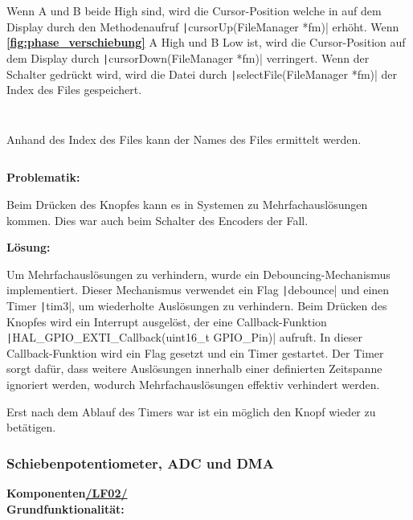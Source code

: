Wenn A und B beide High sind, wird die Cursor-Position welche in auf dem Display durch den Methodenaufruf \texttt|cursorUp(FileManager *fm)|
erhöht. Wenn  \textbf{\autoref{fig:phase_verschiebung}} A High und B Low ist, wird die Cursor-Position auf dem Display durch \texttt|cursorDown(FileManager *fm)| verringert. Wenn der Schalter gedrückt wird, wird die Datei durch \texttt|selectFile(FileManager *fm)| der Index des Files gespeichert. 

\newpage 
 \inputminted[firstline=68, lastline=74]{c}{../../f401_display_encoder_fader_test/Core/Src/filemanager.c}
 
  \inputminted[firstline=84, lastline=90]{c}{../../f401_display_encoder_fader_test/Core/Src/filemanager.c}
  
Anhand des Index des Files kann der Names des Files ermittelt werden.

	
\inputminted[firstline=159, lastline=161]{c}{../../f401_display_encoder_fader_test/Core/Src/filemanager.c}

\textbf{Problematik:}

Beim Drücken des Knopfes kann es in Systemen zu Mehrfachauslösungen kommen. Dies war auch beim Schalter des Encoders der Fall.

\textbf{Lösung:}

Um Mehrfachauslösungen zu verhindern, wurde ein Debouncing-Mechanismus implementiert. Dieser Mechanismus verwendet ein Flag \texttt|debounce| und einen Timer \texttt|tim3|, um wiederholte Auslösungen zu verhindern. Beim Drücken des Knopfes wird ein Interrupt ausgelöst, der eine Callback-Funktion \texttt|HAL_GPIO_EXTI_Callback(uint16_t GPIO_Pin)| aufruft. In dieser Callback-Funktion wird ein Flag gesetzt und ein Timer gestartet. Der Timer sorgt dafür, dass weitere Auslösungen innerhalb einer definierten Zeitspanne ignoriert werden, wodurch Mehrfachauslösungen effektiv verhindert werden.

Erst nach dem Ablauf des Timers war ist ein möglich den Knopf wieder zu betätigen.

\newpage
\subsubsection{Schiebenpotentiometer, ADC und DMA}
\textbf{Komponenten\hyperlink{LF02_Link}{/LF02/}} \\

\textbf{Grundfunktionalität:}\\

